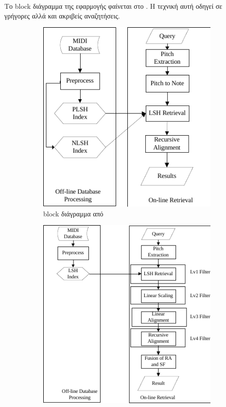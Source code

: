 Το block διάγραμμα της εφαρμογής φαίνεται στο .
Η τεχνική αυτή οδηγεί σε γρήγορες αλλά και ακριβείς αναζητήσεις.

\begin{figure}[htb]
    \centering
    \begin{subfigure}[t]{0.3\linewidth}
        \includegraphics[width=\linewidth]{wang2012query}
        \caption{block διάγραμμα από \protect\cite{wang2012query}}
        \label{fig:wang2012query}
    \end{subfigure}\hfill
    \begin{subfigure}[t]{0.3\linewidth}
        \includegraphics[width=\linewidth]{guo2012query}

\end{subfigure}
\end{figure}
